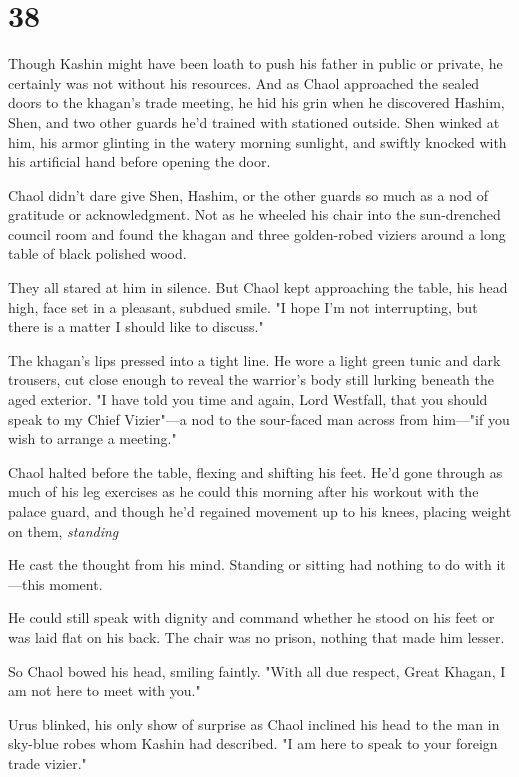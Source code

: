 
\chapter{38}

Though Kashin might have been loath to push his father in public or private, he certainly was not without his resources.
And as Chaol approached the sealed doors to the khagan's trade meeting, he hid his grin when he discovered Hashim, Shen, and two other guards he'd trained with stationed outside.
Shen winked at him, his armor glinting in the watery morning sunlight, and swiftly knocked with his artificial hand before opening the door.

Chaol didn't dare give Shen, Hashim, or the other guards so much as a nod of gratitude or acknowledgment.
Not as he wheeled his chair into the sun-drenched council room and found the khagan and three golden-robed viziers around a long table of black polished wood.

They all stared at him in silence.
But Chaol kept approaching the table, his head high, face set in a pleasant, subdued smile.
"I hope I'm not interrupting, but there is a matter I should like to discuss."

The khagan's lips pressed into a tight line.
He wore a light green tunic and dark trousers, cut close enough to reveal the warrior's body still lurking beneath the aged exterior.
"I have told you time and again, Lord Westfall, that you should speak to my Chief Vizier"---a nod to the sour-faced man across from him---"if you wish to arrange a meeting."

Chaol halted before the table, flexing and shifting his feet.
He'd gone through as much of his leg exercises as he could this morning after his workout with the palace guard, and though he'd regained movement up to his knees, placing weight on them, \emph{standing} 

He cast the thought from his mind.
Standing or sitting had nothing to do with it---this moment.

He could still speak with dignity and command whether he stood on his feet or was laid flat on his back.
The chair was no prison, nothing that made him lesser.

So Chaol bowed his head, smiling faintly.
"With all due respect, Great Khagan, I am not here to meet with you."

Urus blinked, his only show of surprise as Chaol inclined his head to the man in sky-blue robes whom Kashin had described.
"I am here to speak to your foreign trade vizier."

